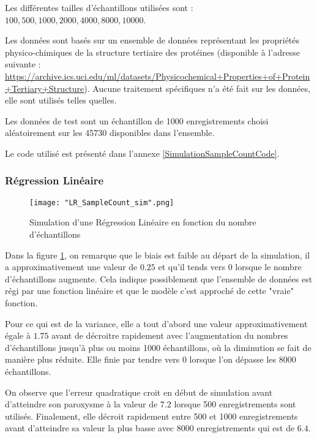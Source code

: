 \documentclass[a4paper]{article}
\begin{document}
Les différentes tailles d'échantillons utilisées sont : $100, 500, 1000, 2000, 4000, 8000, 10000$. \newline

Les données sont basés sur un ensemble de données représentant les propriétés physico-chimiques de la structure tertiaire des protéines (disponible à l'adresse suivante : \url{https://archive.ics.uci.edu/ml/datasets/Physicochemical+Properties+of+Protein+Tertiary+Structure}). Aucune traitement spécifiques n'a été fait sur les données, elle sont utilisés telles quelles. \newline

Les données de test sont un échantillon de 1000 enregistrements choisi aléatoirement sur les 45730 disponibles dans l'ensemble. \newline 

Le code utilisé est présenté dans l'annexe \ref{SimulationSampleCountCode}.

\newpage

\subsubsection{Régression Linéaire}

\begin{figure}[!h]
	\centering
	\texttt{[image: "LR\_SampleCount\_sim".png]}
	\caption{Simulation d'une Régression Linéaire en fonction du nombre d'échantillons}
	\label{LR_SampleCount}
\end{figure}

Dans la figure \ref{LR_SampleCount}, on remarque que le biais est faible au départ de la simulation, il a approximativement une valeur de $0.25$ et qu'il tends vers $0$ lorsque le nombre d'échantillons augmente. Cela indique possiblement que l'ensemble de données est régi par une fonction linéaire et que le modèle c'est approché de cette "vraie" fonction.\newline

Pour ce qui est de la variance, elle a tout d'abord une valeur approximativement égale à $1.75$ avant de décroitre rapidement avec l'augmentation du nombres d'échantillons jusqu'à plus ou moins 1000 échantillons, où la diminution se fait de manière plus réduite. Elle finie par tendre vers $0$ lorsque l'on dépasse les 8000 échantillons. \newline

On observe que l'erreur quadratique croit en début de simulation avant d'atteindre son paroxysme à la valeur de $7.2$ lorsque 500 enregistrements sont utilisés. Finalement, elle décroit rapidement entre 500 et 1000 enregistrements avant d'atteindre sa valeur la plus basse avec 8000 enregistrements qui est de $6.4$.
\end{document}
